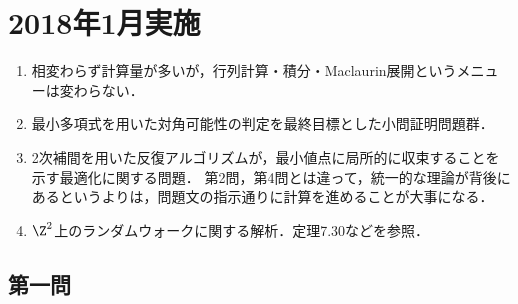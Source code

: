 \documentclass[uplatex,dvipdfmx]{jsarticle}
\begin{document}
\section{2018年1月実施}

\begin{tcolorbox}[colframe=ForestGreen, colback=ForestGreen!10!white,breakable,colbacktitle=ForestGreen!40!white,coltitle=black,fonttitle=\bfseries\sffamily,
    title=概観]
    \begin{enumerate}[{第}1{問}]
        \item 相変わらず計算量が多いが，行列計算・積分・Maclaurin展開というメニューは変わらない．
        \item 最小多項式を用いた対角可能性の判定を最終目標とした小問証明問題群．
        \item 2次補間を用いた反復アルゴリズムが，最小値点に局所的に収束することを示す最適化に関する問題．
        第2問，第4問とは違って，統一的な理論が背後にあるというよりは，問題文の指示通りに計算を進めることが大事になる．
        \item $\Z^2$上のランダムウォークに関する解析．\cite{舟木-確率論}定理7.30などを参照．
    \end{enumerate}
\end{tcolorbox}

\subsection{第一問}
\end{document}
